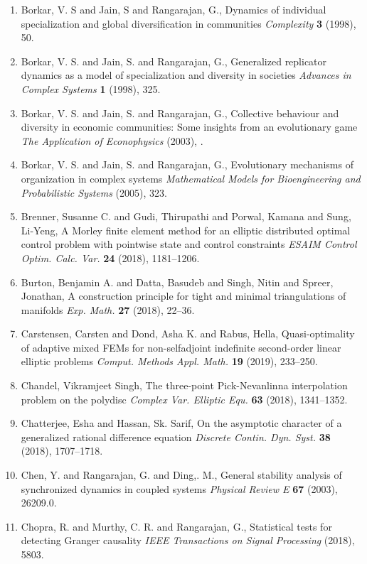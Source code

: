 \begin{enumerate}
\item Borkar, V. S and Jain, S and Rangarajan, G., Dynamics of individual specialization and global diversification in   communities {\em Complexity} {\bf 3} (1998), 50.
\item Borkar, V. S. and Jain, S. and Rangarajan, G., Generalized replicator dynamics as a model of specialization and   diversity in societies {\em Advances in Complex Systems} {\bf 1} (1998), 325.
\item Borkar, V. S. and Jain, S. and Rangarajan, G., Collective behaviour and diversity in economic communities: Some insights from an evolutionary game {\em The Application of Econophysics} {\bf } (2003), .
\item Borkar, V. S. and Jain, S. and Rangarajan, G., Evolutionary mechanisms of organization in complex systems {\em Mathematical Models for Bioengineering and Probabilistic Systems} {\bf } (2005), 323.
\item Brenner, Susanne C. and Gudi, Thirupathi and Porwal, Kamana
and Sung, Li-Yeng, A {M}orley finite element method for an elliptic distributed
optimal control problem with pointwise state and control
constraints {\em ESAIM Control Optim. Calc. Var.} {\bf 24} (2018), 1181--1206.
\item Burton, Benjamin A. and Datta, Basudeb and Singh, Nitin and
Spreer, Jonathan, A construction principle for tight and minimal triangulations
of manifolds {\em Exp. Math.} {\bf 27} (2018), 22--36.
\item Carstensen, Carsten and Dond, Asha K. and Rabus, Hella, Quasi-optimality of adaptive mixed {FEM}s for non-selfadjoint
indefinite second-order linear elliptic problems {\em Comput. Methods Appl. Math.} {\bf 19} (2019), 233--250.
\item Chandel, Vikramjeet Singh, The three-point {P}ick-{N}evanlinna interpolation problem on
the polydisc {\em Complex Var. Elliptic Equ.} {\bf 63} (2018), 1341--1352.
\item Chatterjee, Esha and Hassan, Sk. Sarif, On the asymptotic character of a generalized rational
difference equation {\em Discrete Contin. Dyn. Syst.} {\bf 38} (2018), 1707--1718.
\item Chen, Y. and Rangarajan, G. and Ding,. M., General stability analysis of synchronized dynamics in coupled systems {\em Physical Review E} {\bf 67} (2003), 26209.0.
\item Chopra, R. and Murthy, C. R. and Rangarajan, G., Statistical tests for detecting Granger causality {\em IEEE Transactions on Signal Processing} {\bf } (2018), 5803.

\end{enumerate}
